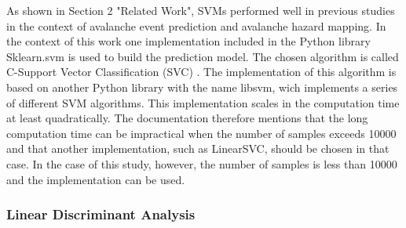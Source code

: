 \documentclass[../masterarbeit.tex]{subfiles}
\begin{document}
As shown in Section 2 "Related Work", SVMs performed well in previous studies in the context of avalanche event prediction and avalanche hazard mapping. \autocites[]{Tiwari:2021, THURING201560, Bahram:2019, Pozdnoukhov:2008}
In the context of this work one implementation included in the Python library Sklearn.svm is used to build the prediction model. The chosen algorithm is called C-Support Vector Classification (SVC) \textcite[]{Scikit-learn-svc:2022} . The implementation of this algorithm is based on another Python library with the name libsvm, wich implements a series of different SVM algorithms. This implementation scales in the computation time at least quadratically. The documentation therefore mentions that the long computation time can be impractical when the number of samples exceeds 10000 and that another implementation, such as LinearSVC, should be chosen in that case. \autocite[]{Scikit-learn-svc:2022}
In the case of this study, however, the number of samples is less than 10000 and the implementation can be used.




\subsubsection{Linear Discriminant Analysis}
\end{document}
